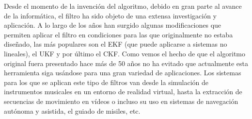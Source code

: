 Desde el momento de la invención del algoritmo, debido en gran parte al avance de la informática, el filtro ha sido objeto de una extensa investigación y aplicación. 
%
%
%
A lo largo de los años han surgido algunas modificaciones que permiten aplicar el filtro en condiciones para las que originalmente no estaba diseñado, las más populares son el \ac{EKF} (que puede aplicarse a sistemas no lineales), el \ac{UKF} y por último el \ac{CKF}.
Como vemos el hecho de que el algoritmo original fuera presentado hace más de 50 años no ha evitado que actualmente esta herramienta siga usándose para una gran variedad de aplicaciones. 
Los sistemas para los que se aplican este tipo de filtros van desde la simulación de instrumentos musicales en un entorno de realidad virtual, hasta la extracción de secuencias de movimiento en vídeos o incluso su uso en sistemas de navegación autónoma y asistida, el guiado de misiles, etc.
%
%
%
%
%


